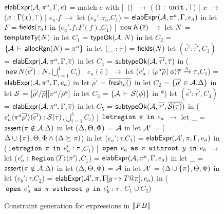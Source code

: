 \begin{figure}

\begin{codeml}
${\sf elabExpr}({\mathcal{A}},\pi^a,\Gamma,e)$ = 
  match $e$ with
  | $\,{\tt ()}\,$ $\longrightarrow$ ($\,{\tt ()}\,:\,{\tt unit}\,$,$\top$)
  | $x$ $\longrightarrow$ ($x:\Gamma(x)$,$\top$)
  | $e_a.f$ $\longrightarrow$ 
    let ($e_a':\tau_a$,$C_1$) = ${\sf elabExpr}({\mathcal{A}},\pi^a,\Gamma,e_a)$ in
    let $F$ = ${\sf fields}(\tau_a)$ in
      ($e_a'.f:F(f)$,$C_1$)
  | $\,{\tt new}\, K(\overline{e})$ $\longrightarrow$ 
    let $N$ = ${\sf templateTy}(N)$ in
    let $C_1$ = ${\sf typeOk}({{\mathcal{A}}},{N})$ in
    let $C_2$ = $\{{\mathcal{A}}\,\vdash\,{\sf allocRgn}(N)=\pi^a\}$ in
    let ($\_:\overline{\tau}$) = ${\sf fields}(N)$
    let $(\bar{e'}:\bar{\tau'}, C_3)$ = ${\sf elabExpr}({\mathcal{A}},\pi^a,\Gamma,\overline{e})$ in
    let $C_4$ = ${\sf subtypeOk}({{\mathcal{A}}},{\overline{\tau'}},{\overline{\tau}})$ in
      ($\,{\tt new}\, N(\overline{e'}) : N$,$\bigcup_{i=1}^4 C_i$)
  | $e_a(\bar{e})$ $\longrightarrow$ 
    let ($e_a':\langle \rho^a\overline{\rho}\,|\,\phi \rangle\overline{\tau} \xrightarrow{\pi} \tau$,$C_1$) = 
                ${\sf elabExpr}({\mathcal{A}},\pi^a,\Gamma,e_a)$ in
    let $\bar{\rho'}$ = $\overline{{\sf fresh}_\rho()}$ in
    let $C_2$ = $\{\overline{\rho'} \in {\mathcal{A}}.\Delta\}$ in
    let $\mathcal{S}$ = $[\overline{\rho'}/\overline{\rho}][\pi^a/\rho^a]$ in
    let $C_3$ = $\{{\mathcal{A}}\,\vdash\,\mathcal{S}(\phi)\}$ in
*)   let $(\bar{e'}:\bar{\tau'}, C_4)$ = ${\sf elabExpr}({\mathcal{A}},\pi^a,\Gamma,\overline{e})$ in
    let $C_5$ = ${\sf subtypeOk}({{\mathcal{A}}},{\overline{\tau'}},{\overline{\mathcal{S}(\tau)}})$ in
      ($e_a'\langle \pi^a\overline{\rho'} \rangle(\overline{e'}):\mathcal{S}(\tau)$,$\bigcup_{i=1}^5 C_i$)
  | $\,{\tt letregion}\,\;\pi\;\,{\tt in}\,\;e_a$ $\longrightarrow$
    let _ = ${\sf assert}(\pi \notin {\mathcal{A}}.\Delta)$ in
    let $(\Delta,\Theta,\Phi)$ = ${\mathcal{A}}$ in
    let ${\mathcal{A}}'$ = ($\Delta \cup \{\pi\}, \Theta, \Phi \wedge (\Delta \succeq \pi)$) in
    let ($e_a':\tau$,$C_1$) = ${\sf elabExpr}({\mathcal{A}}',\pi,\Gamma,e_a)$ in
      ($\,{\tt letregion}\,\;\pi\;\,{\tt in}\,\;e_a':\tau$,$C_1$)
  | $\,{\tt open}\,\;e_a\;\,{\tt as}\,\;\pi\;\,{\tt withroot}\,\;y\;\,{\tt in}\,\;e_b$ $\longrightarrow$ 
    let ($e_a':\,{\tt Region}\,\langle T \rangle\langle \pi' \rangle$,$C_1$) = 
                ${\sf elabExpr}({\mathcal{A}},\pi^a,\Gamma,e_a)$ in
    let _ = ${\sf assert}(\pi \notin {\mathcal{A}}.\Delta)$ in
    let $(\Delta,\Theta,\Phi)$ = ${\mathcal{A}}$ in
    let ${\mathcal{A}}'$ = $(\Delta \cup \{\pi\},\Theta,\Phi)$ in
    let ($e_b':\tau$,$C_2$) = ${\sf elabExpr}({\mathcal{A}}',\pi,\Gamma[y\mapsto T@\pi],e_a)$ in
      ($\,{\tt open}\,\;e_a'\;\,{\tt as}\,\;\pi\;\,{\tt withroot}\,\;y\;\,{\tt in}\,\;e_b' : \tau$, $C_1 \cup C_2$)
\end{codeml}

\caption{Constraint generation for expressions in $\left\| {\sc FB} \right\|$}
\label{fig:fb-elabexpr}
\end{figure}

